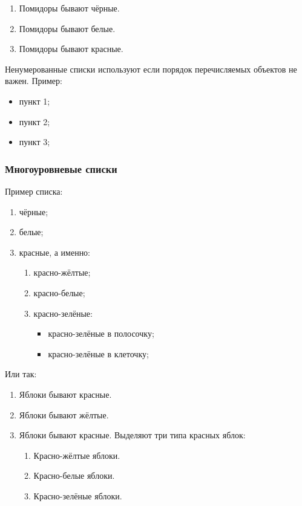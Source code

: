 \begin{enumerate}
	\item Помидоры бывают чёрные.
	\item Помидоры бывают белые.
	\item Помидоры бывают красные.
\end{enumerate}


Ненумерованные списки используют если порядок перечисляемых объектов не важен. Пример:

\begin{itemize}
	\item пункт 1;
	\item пункт 2;
	\item пункт 3;
\end{itemize}

\subsubsection{Многоуровневые списки}

Пример списка:
\begin{enumerate}[label = \arabic*)]
	\item чёрные; 
	\item белые;
	\item  {}%
		красные, а именно:
	\begin{enumerate}[label = {\asbuk*)} ]
		\item {}%
		красно-жёлтые;
		\item красно-белые;
		\item красно-зелёные:
		\begin{itemize}
			\item красно-зелёные в полосочку;
			\item красно-зелёные в клеточку;
		\end{itemize}
	\end{enumerate}
\end{enumerate}

Или так:
\begin{enumerate}[]
	\item Яблоки бывают красные. 
	\item Яблоки бывают жёлтые.
	\item Яблоки бывают красные. Выделяют три типа красных яблок:
	\begin{enumerate}[label*={\arabic*.} ]
		\item Красно-жёлтые яблоки.
		\item Красно-белые яблоки.
		\item Красно-зелёные яблоки.
	\end{enumerate}
\end{enumerate}


